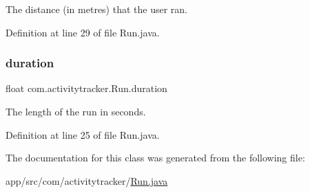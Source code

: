The distance (in metres) that the user ran. 

Definition at line 29 of file Run.\+java.

\mbox{\label{classcom_1_1activitytracker_1_1_run_a5e38d293d29d4b65c9290ff4bee82e03}} 
\subsubsection{\texorpdfstring{duration}{duration}}
{\footnotesize\ttfamily float com.\+activitytracker.\+Run.\+duration\hspace{0.3cm}{\ttfamily [package]}}

The length of the run in seconds. 

Definition at line 25 of file Run.\+java.



The documentation for this class was generated from the following file\+:\begin{DoxyCompactItemize}
\item 
app/src/com/activitytracker/\mbox{\hyperlink{_run_8java}{Run.\+java}}\end{DoxyCompactItemize}
